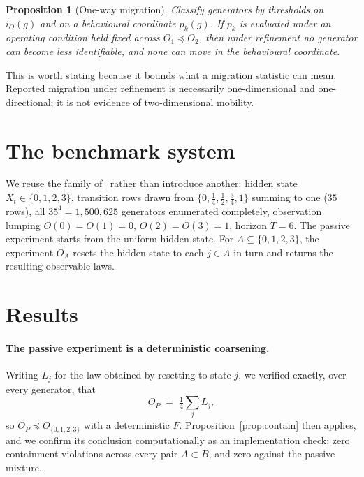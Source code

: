 \documentclass[11pt]{article}
\newtheorem{proposition}{Proposition}
\begin{document}
\begin{proposition}[One-way migration]\label{prop:oneway}
Classify generators by thresholds on $i_O(g)$ and on a behavioural coordinate $p_k(g)$.
If $p_k$ is evaluated under an operating condition held fixed across $O_1 \preceq O_2$,
then under refinement no generator can become less identifiable, and none can move in the
behavioural coordinate.
\end{proposition}

This is worth stating because it bounds what a migration statistic can mean. Reported
migration under refinement is necessarily one-dimensional and one-directional; it is not
evidence of two-dimensional mobility.

\section{The benchmark system}

We reuse the family of~\cite[\S9]{paper1} rather than introduce another: hidden state
$X_t \in \{0,1,2,3\}$, transition rows drawn from
$\{0,\frac14,\frac12,\frac34,1\}$ summing to one ($35$ rows), all $35^4 = 1{,}500{,}625$
generators enumerated completely, observation lumping $O(0)=O(1)=0$, $O(2)=O(3)=1$,
horizon $T=6$. The passive experiment starts from the uniform hidden state. For
$A \subseteq \{0,1,2,3\}$, the experiment $O_A$ resets the hidden state to each $j \in A$
in turn and returns the resulting observable laws.

\section{Results}

\paragraph{The passive experiment is a deterministic coarsening.}
Writing $L_j$ for the law obtained by resetting to state $j$, we verified exactly, over
every generator, that
\[
  O_P \;=\; \tfrac14 \textstyle\sum_{j} L_j ,
\]
so $O_P \preceq O_{\{0,1,2,3\}}$ with a deterministic $F$. Proposition~\ref{prop:contain}
then applies, and we confirm its conclusion computationally as an implementation check:
zero containment violations across every pair $A \subset B$, and zero against the passive
mixture.
\end{document}
